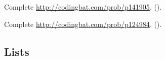 \begin{exercise}
  Complete \url{http://codingbat.com/prob/p141905}. ().
\end{exercise}
\begin{exercise}
  Complete \url{http://codingbat.com/prob/p124984}. ().
\end{exercise}

\subsection{Lists}